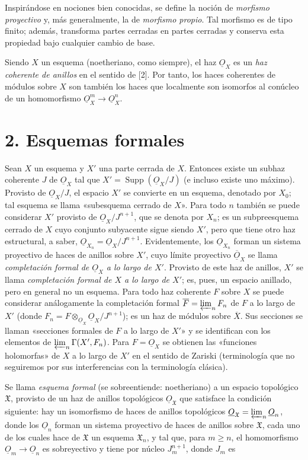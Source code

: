 \documentclass[11pt,twoside,openany]{book}
\numberwithin{equation}{section}
\newcommand{\src}[1]{%
  \phantomsection\hypertarget{src:#1}{}%
  \marginpar{\raggedleft\footnotesize\sffamily #1}%
}
\newcommand{\Osh}{\underline{O}}
\theoremstyle{plain}
\theoremstyle{definition}
\theoremstyle{remark}
\newcommand{\fsection}[2]{%
  \section*{#1. #2}%
  \addcontentsline{toc}{section}{#1. #2}%
}
\newcommand{\FgaUnitKey}{frontmatter}
\renewcommand{\src}[1]{%
  \phantomsection\hypertarget{src:\FgaUnitKey:#1}{}%
  \marginpar{\raggedleft\footnotesize\sffamily #1}%
}
\theoremstyle{plain}
\theoremstyle{definition}
\theoremstyle{remark}
\begin{document}
\src{195}
Inspirándose en nociones bien conocidas, se define la noción de
\emph{morfismo proyectivo} y, más generalmente, la de \emph{morfismo propio}.
Tal morfismo es de tipo finito; además, transforma partes cerradas en partes
cerradas y conserva esta propiedad bajo cualquier cambio de base.

Siendo $X$ un esquema (noetheriano, como siempre), el haz $\Osh_X$ es un
\emph{haz coherente de anillos} en el sentido de [2]. Por tanto, los haces
coherentes de módulos sobre $X$ son también los haces que localmente son
isomorfos al conúcleo de un homomorfismo
$\Osh_X^{m}\longrightarrow\Osh_X^{n}$.

\fsection{2}{Esquemas formales}

Sean $X$ un esquema y $X'$ una parte cerrada de $X$. Entonces existe un
subhaz coherente $J$ de $\Osh_X$ tal que
$X'=\operatorname{Supp}(\Osh_X/J)$ (e incluso existe uno máximo). Provisto de
$\Osh_X/J$, el espacio $X'$ se convierte en un esquema, denotado por $X_0$;
tal esquema se llama «subesquema cerrado de $X$». Para todo $n$ también se
puede considerar $X'$ provisto de $\Osh_X/J^{n+1}$, que se denota por $X_n$;
es un subpreesquema cerrado de $X$ cuyo conjunto subyacente sigue siendo $X'$,
pero que tiene otro haz estructural, a saber,
$\Osh_{X_n}=\Osh_X/J^{n+1}$. Evidentemente, los $\Osh_{X_n}$ forman un sistema
proyectivo de haces de anillos sobre $X'$, cuyo límite proyectivo
$\overline{\Osh}_X$ se llama \emph{completación formal de $\Osh_X$ a lo largo
de $X'$}. Provisto de este haz de anillos, $X'$ se llama \emph{completación
formal de $X$ a lo largo de $X'$}; es, pues, un espacio anillado, pero en
general no un esquema. Para todo haz coherente $F$ sobre $X$ se puede considerar
análogamente la completación formal $\overline F=\varprojlim_n F_n$ de $F$ a lo
largo de $X'$ (donde $F_n=F\otimes_{\Osh_X}\Osh_X/J^{n+1}$); es un haz de
módulos sobre $\overline X$. Sus secciones se llaman «secciones formales de $F$
a lo largo de $X'$» y se identifican con los elementos de
$\varprojlim_n\Gamma(X',F_n)$. Para $F=\Osh_X$ se obtienen las «funciones
holomorfas» de $X$ a lo largo de $X'$ en el sentido de Zariski (terminología que
no seguiremos por sus interferencias con la terminología clásica).

Se llama \emph{esquema formal} (se sobreentiende: noetheriano) a un espacio
topológico $\mathfrak X$, provisto de un haz de anillos topológicos
$\Osh_{\mathfrak X}$ que satisface la condición siguiente: hay un isomorfismo
de haces de anillos topológicos
$\Osh_{\mathfrak X}=\varprojlim_n\Osh_n$, donde los $\Osh_n$ forman un sistema
proyectivo de haces de anillos sobre $\mathfrak X$, cada uno de los cuales hace
de $\mathfrak X$ un esquema $\mathfrak X_n$, y tal que, para $m\geq n$, el
homomorfismo $\Osh_m\longrightarrow\Osh_n$ es sobreyectivo y tiene por núcleo
$J_m^{n+1}$, donde $J_m$ es
\end{document}
